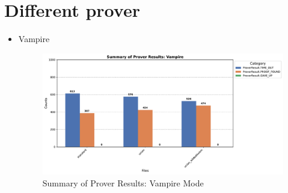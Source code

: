 \documentclass[english,version-2020-11]{uzl-thesis}
\begin{document}
    \section{Different prover}
      \begin{itemize}
        \item Vampire
          \begin{figure}[h!]
            \centering
            \includegraphics[width=\textwidth]{vampire_mode_output.pdf} %
            \caption{Summary of Prover Results: Vampire Mode}
            \label{fig:prover_results_vampire}
          \end{figure}
          \clearpage
      \end{itemize}
\end{document}
